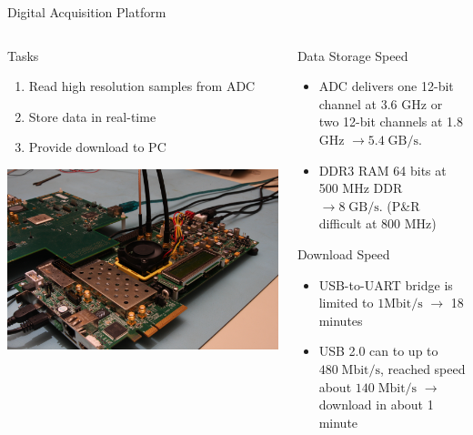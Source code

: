 \documentclass[10pt]{beamer}
\begin{document}
\begin{frame}{Digital Acquisition Platform}
  \begin{columns}[T]
    \begin{column}{.5\textwidth}
      \begin{block}{Tasks}
        \begin{enumerate}
        \item Read high resolution samples from ADC
        \item Store data in real-time
        \item Provide download to PC
        \end{enumerate}
      \end{block}
      \vspace{5mm}
      \includegraphics[width=\textwidth]{pictures/fpga}
    \end{column}
    \begin{column}{.5\textwidth}
      \begin{block}{Data Storage Speed}
        \begin{itemize}
        \item ADC delivers one 12-bit channel at 3.6 GHz or
          two 12-bit channels at 1.8 GHz $\rightarrow 5.4 \;\text{GB}/\text{s}$.
        \item DDR3 RAM 64 bits at 500 MHz DDR $\rightarrow 8 \;\text{GB}/\text{s}$.
          (P\&R difficult at 800 MHz)
        \end{itemize}
      \end{block}
      \begin{block}{Download Speed}
        \begin{itemize}
        \item USB-to-UART bridge is limited to $1 \text{Mbit}/\text{s}$
          $\rightarrow$ 18 minutes
        \item USB 2.0 can to up to $480 \;\text{Mbit}/\text{s}$, reached speed
          about $140 \;\text{Mbit}/\text{s}$ $\rightarrow$ download in about 1 minute
        \end{itemize}
      \end{block}
    \end{column}
  \end{columns}
\end{frame}
\end{document}
